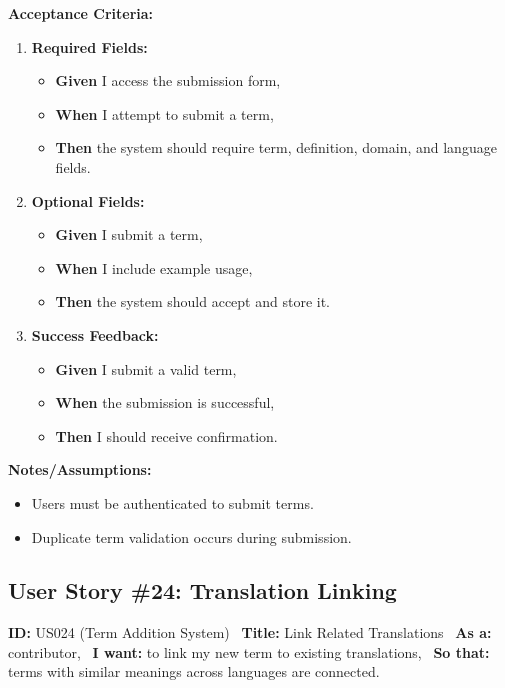 \documentclass[12pt]{article}
\begin{document}
\vspace{1em}
\textbf{Acceptance Criteria:}
\begin{enumerate}
\item \textbf{Required Fields:}
\begin{itemize}
\item \textbf{Given} I access the submission form,
\item \textbf{When} I attempt to submit a term,
\item \textbf{Then} the system should require term, definition, domain, and language fields.
\end{itemize}

\item \textbf{Optional Fields:}
\begin{itemize}
    \item \textbf{Given} I submit a term,
    \item \textbf{When} I include example usage,
    \item \textbf{Then} the system should accept and store it.
\end{itemize}

\item \textbf{Success Feedback:}
\begin{itemize}
    \item \textbf{Given} I submit a valid term,
    \item \textbf{When} the submission is successful,
    \item \textbf{Then} I should receive confirmation.
\end{itemize}
\end{enumerate}

\vspace{1em}
\textbf{Notes/Assumptions:}
\begin{itemize}
\item Users must be authenticated to submit terms.
\item Duplicate term validation occurs during submission.
\end{itemize}

\subsection{User Story \#24: Translation Linking}
\textbf{ID:} US024 (Term Addition System) \
\textbf{Title:} Link Related Translations \
\textbf{As a:} contributor, \
\textbf{I want:} to link my new term to existing translations, \
\textbf{So that:} terms with similar meanings across languages are connected.
\end{document}
